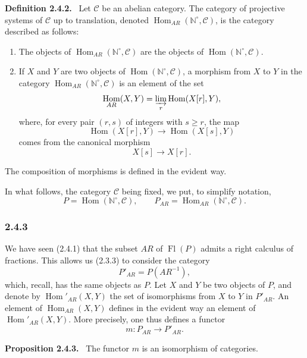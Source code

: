 \documentclass[11pt]{article}
\providecommand{\NN}{\mathbb{N}}
\newenvironment{statement}[1]{\par\medskip\noindent\textbf{#1.}\ }{\par\medskip}
\DeclareMathOperator{\Hom}{Hom}
\providecommand{\Hom}{\operatorname{Hom}}
\providecommand{\Fl}{\operatorname{Fl}}
\providecommand{\NN}{\mathbb N}
\providecommand{\cC}{\mathcal C}
\providecommand{\cC}{\mathcal C}
\providecommand{\Hom}{\operatorname{Hom}}
\begin{document}
\begin{statement}{Definition 2.4.2}
Let $\cC$ be an abelian category. The category of projective systems of $\cC$ up to translation, denoted $\Hom_{AR}(\NN^\circ,\cC)$, is the category described as follows:
\begin{enumerate}[label=(\roman*)]
\item The objects of $\Hom_{AR}(\NN^\circ,\cC)$ are the objects of $\Hom(\NN^\circ,\cC)$.
\item If $X$ and $Y$ are two objects of $\Hom(\NN^\circ,\cC)$, a morphism from $X$ to $Y$ in the category $\Hom_{AR}(\NN^\circ,\cC)$ is an element of the set
\[
\Hom_{AR}(X,Y)=\varinjlim_r\Hom(X[r],Y),
\]
where, for every pair $(r,s)$ of integers with $s\ge r$, the map
\[
\Hom(X[r],Y)\longrightarrow\Hom(X[s],Y)
\]
comes from the canonical morphism
\[
X[s]\longrightarrow X[r].
\]
\end{enumerate}
The composition of morphisms is defined in the evident way.
\end{statement}
In what follows, the category $\cC$ being fixed, we put, to simplify notation,
\[
P=\Hom(\NN^\circ,\cC),\qquad P_{AR}=\Hom_{AR}(\NN^\circ,\cC).
\]

\subsubsection*{2.4.3}
We have seen (2.4.1) that the subset $AR$ of $\Fl(P)$ admits a right calculus of fractions. This allows us (2.3.3) to consider the category
\[
P'_{AR}=P(AR^{-1}),
\]
which, recall, has the same objects as $P$. Let $X$ and $Y$ be two objects of $P$, and denote by $\Hom'_{AR}(X,Y)$ the set of isomorphisms from $X$ to $Y$ in $P'_{AR}$. An element of $\Hom_{AR}(X,Y)$ defines in the evident way an element of $\Hom'_{AR}(X,Y)$. More precisely, one thus defines a functor
\[
m:P_{AR}\longrightarrow P'_{AR}.
\]

\begin{statement}{Proposition 2.4.3}
The functor $m$ is an isomorphism of categories.
\end{statement}
\end{document}
